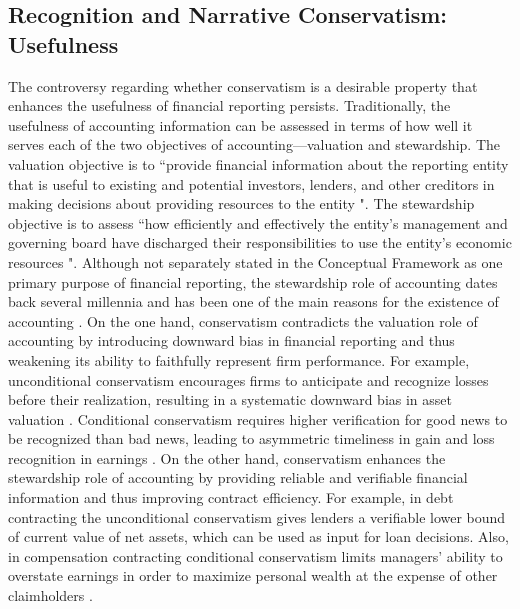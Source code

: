 \documentclass[a4paper]{article}
\begin{document}
\begin{spacing}{2}
\subsection{Recognition and Narrative Conservatism: Usefulness}
The controversy regarding whether conservatism is a desirable property that enhances the usefulness of financial reporting persists. Traditionally, the usefulness of accounting information can be assessed in terms of how well it serves each of the two objectives of accounting---valuation and stewardship. The valuation objective is to ``provide financial information about the reporting entity that is useful to existing and potential investors, lenders, and other creditors in making decisions about providing resources to the entity \citep[OB2]{fasbConceptualFrameworkFinancial2018b}". The stewardship objective is to assess ``how efficiently and effectively the entity's management and governing board have discharged their responsibilities to use the entity's economic resources \cite[OB4]{fasbConceptualFrameworkFinancial2018b}". Although not separately stated in the Conceptual Framework as one primary purpose of financial reporting, the stewardship role of accounting dates back several millennia and has been one of the main reasons for the existence of accounting \citep{lennardStewardshipObjectivesFinancial2007, murphyDiscoursesSurroundingEvolution2013, pelgerPracticesStandardsettingAnalysis2016}. On the one hand, conservatism contradicts the valuation role of accounting by introducing downward bias in financial reporting and thus weakening its ability to faithfully represent firm performance. For example, unconditional conservatism encourages firms to anticipate and recognize losses before their realization, resulting in a systematic downward bias in asset valuation \citep*[e.g.,][]{wattsPositiveAccountingTheory1986}. Conditional conservatism requires higher verification for good news to be recognized than bad news, leading to asymmetric timeliness in gain and loss recognition in earnings \citep*[e.g.,][]{basuConservatismPrincipleAsymmetric1997}. On the other hand, conservatism enhances the stewardship role of accounting by providing reliable and verifiable financial information and thus improving contract efficiency. For example, in debt contracting the unconditional conservatism gives lenders a verifiable lower bound of current value of net assets, which can be used as input for loan decisions. Also, in compensation contracting conditional conservatism limits managers' ability to overstate earnings in order to maximize personal wealth at the expense of other claimholders \citep*[e.g.,][]{wattsConservatismAccountingPart2003}.


\end{spacing}
\end{document}
